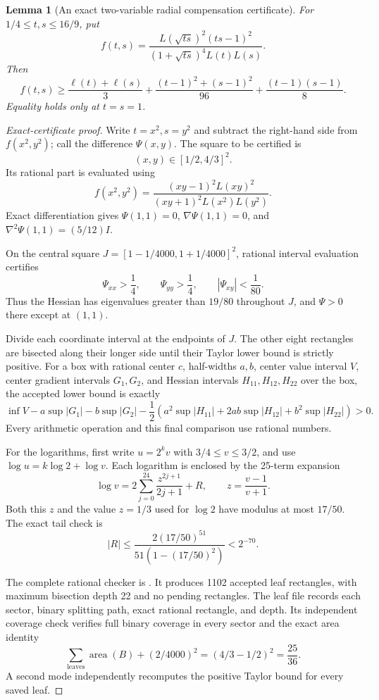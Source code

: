 \documentclass[11pt]{article}
\newtheorem{lemma}[theorem]{Lemma}
\theoremstyle{remark}
\numberwithin{equation}{section}
\begin{document}
\begin{lemma}[An exact two-variable radial compensation certificate]
\label{lem:noclass-pair8}
For $1/4\le t,s\le16/9$, put
\[
 f(t,s)=
 \frac{L(\sqrt{ts})^2(ts-1)^2}
 {(1+\sqrt{ts})^4L(t)L(s)}.
\]
Then
\begin{equation}\label{eq:noclass-pair8}
 f(t,s)\ge
 \frac{\ell(t)+\ell(s)}3+
 \frac{(t-1)^2+(s-1)^2}{96}
 +\frac{(t-1)(s-1)}8.
\end{equation}
Equality holds only at $t=s=1$.
\end{lemma}
\begin{proof}[Exact-certificate proof]
Write $t=x^2,s=y^2$ and subtract the right-hand side from
$f(x^2,y^2)$; call the difference $\Psi(x,y)$.
The square to be certified is
\[
 (x,y)\in[1/2,4/3]^2.
\]
Its rational part is evaluated using
\[
 f(x^2,y^2)=
 \frac{(xy-1)^2L(xy)^2}
 {(xy+1)^2L(x^2)L(y^2)}.
\]
Exact differentiation gives $\Psi(1,1)=0$,
$\nabla\Psi(1,1)=0$, and
$\nabla^2\Psi(1,1)=(5/12)I$.

On the central square $J=[1-1/4000,1+1/4000]^2$,
rational interval evaluation certifies
\[
 \Psi_{xx}>\frac14,\qquad
 \Psi_{yy}>\frac14,\qquad
 |\Psi_{xy}|<\frac1{80}.
\]
Thus the Hessian has eigenvalues greater than $19/80$
throughout $J$, and $\Psi>0$ there except at $(1,1)$.

Divide each coordinate interval at the endpoints of $J$.
The other eight rectangles are bisected along their longer
side until their Taylor lower bound is strictly positive.
For a box with rational center $c$, half-widths $a,b$, center
value interval $V$, center gradient intervals $G_1,G_2$,
and Hessian intervals $H_{11},H_{12},H_{22}$ over the box,
the accepted lower bound is exactly
\[
 \inf V-a\sup|G_1|-b\sup|G_2|
 -\frac12\left(
 a^2\sup|H_{11}|+2ab\sup|H_{12}|+b^2\sup|H_{22}|
 \right)>0.
\]
Every arithmetic operation and this final comparison use
rational numbers.

For the logarithms, first write $u=2^k v$ with
$3/4\le v\le3/2$, and use $\log u=k\log2+\log v$.
Each logarithm is enclosed by the 25-term expansion
\[
 \log v=2\sum_{j=0}^{24}\frac{z^{2j+1}}{2j+1}+R,
 \qquad z=\frac{v-1}{v+1}.
\]
Both this $z$ and the value $z=1/3$ used for $\log2$
have modulus at most $17/50$. The exact tail check is
\[
 |R|\le
 \frac{2(17/50)^{51}}{51(1-(17/50)^2)}<2^{-70}.
\]

The complete rational checker is
. It produces 1102 accepted leaf
rectangles, with maximum bisection depth 22 and no pending
rectangles. The leaf file
 records each sector,
binary splitting path, exact rational rectangle, and depth.
Its independent coverage check verifies full binary coverage
in every sector and the exact area identity
\[
 \sum_{\text{leaves}}\operatorname{area}(B)
 +(2/4000)^2=(4/3-1/2)^2=\frac{25}{36}.
\]
A second mode independently recomputes the positive Taylor
bound for every saved leaf.


\end{proof}
\end{document}
